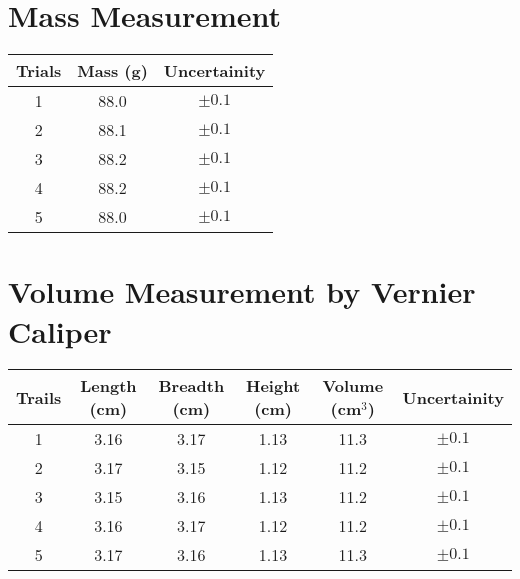 \section{{Mass Measurement}}
        
    \begin{table}[H]
                \centering
                \begin{tabular}{|c|c|c|}
                \hline
                \hline
                {Trials} & {Mass (g)} & {Uncertainity} \\
                \hline
                \hline
                1 & 88.0 & $\pm 0.1$ \\
                \hline
                2 & 88.1 & $\pm 0.1$ \\
                \hline
                3 & 88.2 & $\pm 0.1$ \\
                \hline
                4 & 88.2 & $\pm 0.1$ \\
                \hline
                5 & 88.0 & $\pm 0.1$ \\
                \hline
                \hline
                \end{tabular}
                \label{}
    \end{table}

\section{{Volume Measurement by Vernier Caliper}}
        
    \begin{table}[H]
                \centering
                \begin{tabular}{|c|c|c|c|c|c|}
                \hline
                \hline
                {Trails} & {Length (cm)} & {Breadth (cm)} & {Height (cm)} & {Volume (cm$^3$)} & {Uncertainity} \\
                \hline
                \hline
                1 & 3.16 & 3.17 & 1.13 & 11.3 & $\pm 0.1$ \\
                \hline
                2 & 3.17 & 3.15 & 1.12 & 11.2 & $\pm 0.1$ \\
                \hline
                3 & 3.15 & 3.16 & 1.13 & 11.2 & $\pm 0.1$ \\
                \hline
                4 & 3.16 & 3.17 & 1.12 & 11.2 & $\pm 0.1$ \\
                \hline
                5 & 3.17 & 3.16 & 1.13 & 11.3 & $\pm 0.1$ \\
                \hline
                \hline
                \end{tabular}
                \label{}
    \end{table}
        

